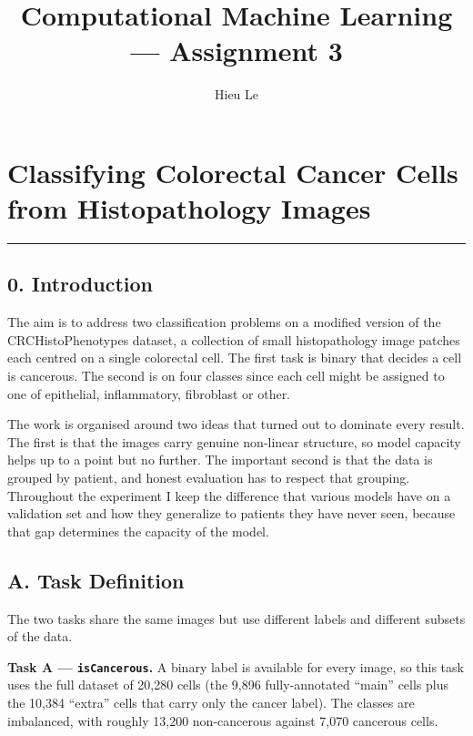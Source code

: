 \documentclass[
  11pt,
]{article}
\title{Computational Machine Learning --- Assignment 3}
\author{Hieu Le}
\date{}
\begin{document}
\maketitle

\hypertarget{classifying-colorectal-cancer-cells-from-histopathology-images}{%
\section{Classifying Colorectal Cancer Cells from Histopathology
Images}\label{classifying-colorectal-cancer-cells-from-histopathology-images}}



\begin{center}\rule{0.5\linewidth}{0.5pt}\end{center}

\hypertarget{introduction}{%
\subsection{0. Introduction}\label{introduction}}

The aim is to address two classification problems on a modified version
of the CRCHistoPhenotypes dataset, a collection of small histopathology
image patches each centred on a single colorectal cell. The first task
is binary that decides a cell is cancerous. The second is on four classes since each cell might be assigned to one of epithelial, inflammatory, fibroblast
or other.

The work is organised around two ideas that turned out to dominate every
result. The first is that the images carry genuine non-linear structure,
so model capacity helps up to a point but no further. The important second is that the data is grouped by patient, and honest
evaluation has to respect that grouping. Throughout the experiment I keep
the difference that various models have on a validation
set and how they generalize to patients they have never seen, because that gap
 determines the capacity of the model.

\hypertarget{a.-task-definition}{%
\subsection{A. Task Definition}\label{a.-task-definition}}

The two tasks share the same images but use different labels and
different subsets of the data.

\textbf{Task A --- \texttt{isCancerous}.} A binary label is available
for every image, so this task uses the full dataset of 20,280 cells (the
9,896 fully-annotated ``main'' cells plus the 10,384 ``extra'' cells
that carry only the cancer label). The classes are imbalanced, with
roughly 13,200 non-cancerous against 7,070 cancerous cells.
\end{document}

